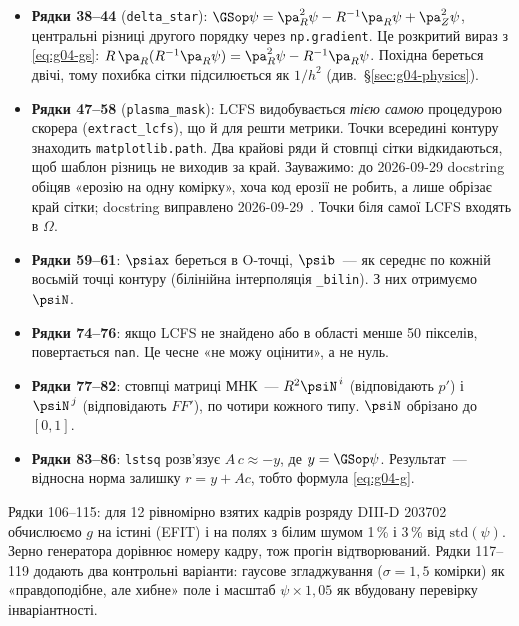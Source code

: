\begin{itemize}
\item \textbf{Рядки 38--44} (\texttt{delta\_star}): $\GSop\psi=\pa_R^2\psi-R^{-1}\pa_R\psi+\pa_Z^2\psi$, центральні різниці другого порядку через \texttt{np.gradient}. Це розкритий вираз з \eqref{eq:g04-gs}: $R\,\pa_R(R^{-1}\pa_R\psi)=\pa_R^2\psi-R^{-1}\pa_R\psi$. Похідна береться двічі, тому похибка сітки підсилюється як $1/h^2$ (див.~\S\ref{sec:g04-physics}).
\item \textbf{Рядки 47--58} (\texttt{plasma\_mask}): LCFS видобувається \emph{тією самою} процедурою скорера (\texttt{extract\_lcfs}), що й для решти метрики. Точки всередині контуру знаходить \texttt{matplotlib.path}. Два крайові ряди й стовпці сітки відкидаються, щоб шаблон різниць не виходив за край. Зауважимо: до 2026-09-29 docstring обіцяв «ерозію на одну комірку», хоча код ерозії не робить, а лише обрізає край сітки; docstring виправлено 2026-09-29~\cite{RegLog}. Точки біля самої LCFS входять в $\Omega$.
\item \textbf{Рядки 59--61}: $\psiax$ береться в O-точці, $\psib$~--- як середнє по кожній восьмій точці контуру (білінійна інтерполяція \texttt{\_bilin}). З них отримуємо $\psiN$.
\end{itemize}


\begin{itemize}
\item \textbf{Рядки 74--76}: якщо LCFS не знайдено або в області менше 50 пікселів, повертається \texttt{nan}. Це чесне «не можу оцінити», а не нуль.
\item \textbf{Рядки 77--82}: стовпці матриці МНК~--- $R^2\psiN^{\,i}$ (відповідають $p'$) і $\psiN^{\,j}$ (відповідають $FF'$), по чотири кожного типу. $\psiN$ обрізано до $[0,1]$.
\item \textbf{Рядки 83--86}: \texttt{lstsq} розв'язує $A\,c\approx-y$, де $y=\GSop\psi$. Результат~--- відносна норма залишку $r=y+Ac$, тобто формула \eqref{eq:g04-g}.
\end{itemize}


Рядки 106--115: для 12 рівномірно взятих кадрів розряду DIII-D 203702 обчислюємо $g$ на істині (EFIT) і на полях з білим шумом 1\,\% і 3\,\% від $\mathrm{std}(\psi)$. Зерно генератора дорівнює номеру кадру, тож прогін відтворюваний. Рядки 117--119 додають два контрольні варіанти: гаусове згладжування ($\sigma=1{,}5$ комірки) як «правдоподібне, але хибне» поле і масштаб $\psi\times1{,}05$ як вбудовану перевірку інваріантності.

